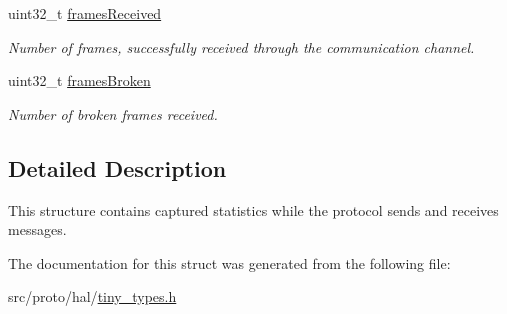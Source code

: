 \begin{DoxyCompactItemize}
\mbox{\label{structSTinyStats_a19dfd3a62dbb9d86f6fb77eb1ea6f871}} 
uint32\+\_\+t \hyperlink{structSTinyStats_a19dfd3a62dbb9d86f6fb77eb1ea6f871}{frames\+Received}
\begin{DoxyCompactList}\small\item\em Number of frames, successfully received through the communication channel. \end{DoxyCompactList}\item 
\mbox{\label{structSTinyStats_abe4f4a9455b532e22f29e60789386130}} 
uint32\+\_\+t \hyperlink{structSTinyStats_abe4f4a9455b532e22f29e60789386130}{frames\+Broken}
\begin{DoxyCompactList}\small\item\em Number of broken frames received. \end{DoxyCompactList}\end{DoxyCompactItemize}


\subsection{Detailed Description}
This structure contains captured statistics while the protocol sends and receives messages. 

The documentation for this struct was generated from the following file\+:\begin{DoxyCompactItemize}
\item 
src/proto/hal/\hyperlink{tiny__types_8h}{tiny\+\_\+types.\+h}\end{DoxyCompactItemize}
